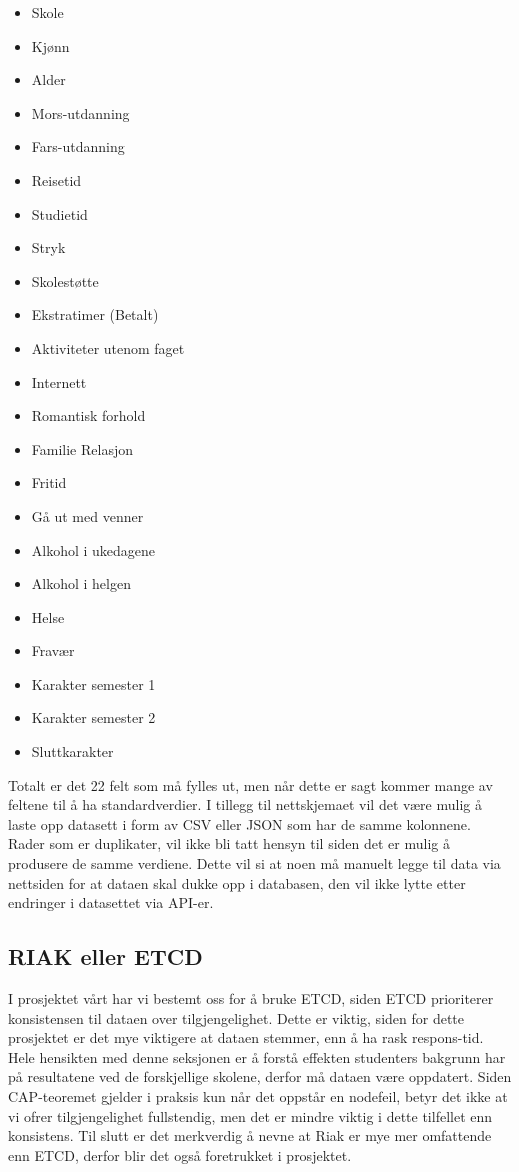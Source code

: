 \begin{itemize}
  \item Skole
  \item Kjønn
  \item Alder
  \item Mors-utdanning
  \item Fars-utdanning
  \item Reisetid
  \item Studietid
  \item Stryk
  \item Skolestøtte
  \item Ekstratimer (Betalt)
  \item Aktiviteter utenom faget
  \item Internett
  \item Romantisk forhold
  \item Familie Relasjon
  \item Fritid
  \item Gå ut med venner
  \item Alkohol i ukedagene
  \item Alkohol i helgen
  \item Helse
  \item Fravær
  \item Karakter semester 1
  \item Karakter semester 2
  \item Sluttkarakter
\end{itemize}

Totalt er det 22 felt som må fylles ut, men når dette er sagt kommer mange av feltene til å ha standardverdier. I tillegg til nettskjemaet vil det være mulig å laste opp datasett i form av CSV eller JSON som har de samme kolonnene. Rader som er duplikater, vil ikke bli tatt hensyn til siden det er mulig å produsere de samme verdiene. Dette vil si at noen må manuelt legge til data via nettsiden for at dataen skal dukke opp i databasen, den vil ikke lytte etter endringer i datasettet via API-er.

\subsection{RIAK eller ETCD}
I prosjektet vårt har vi bestemt oss for å bruke ETCD, siden ETCD prioriterer konsistensen til dataen over tilgjengelighet. Dette er viktig, siden for dette prosjektet er det mye viktigere at dataen stemmer, enn å ha rask respons-tid. Hele hensikten med denne seksjonen er å forstå effekten studenters bakgrunn har på resultatene ved de forskjellige skolene, derfor må dataen være oppdatert. Siden CAP-teoremet gjelder i praksis kun når det oppstår en nodefeil, betyr det ikke at vi ofrer tilgjengelighet fullstendig, men det er mindre viktig i dette tilfellet enn konsistens. Til slutt er det merkverdig å nevne at Riak er mye mer omfattende enn ETCD, derfor blir det også foretrukket i prosjektet.

